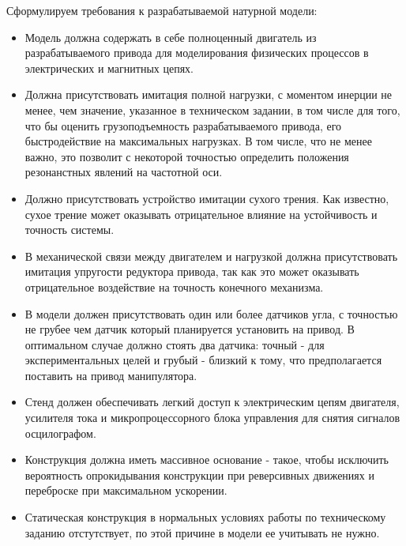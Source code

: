 Сформулируем требования к разрабатываемой натурной модели:
\begin{itemize}
    \item Модель должна содержать в себе полноценный двигатель из разрабатываемого
    привода для моделирования физических процессов в электрических и магнитных цепях.

    \item Должна присутствовать имитация полной нагрузки, с моментом инерции не менее, чем
    значение, указанное в техническом задании, в том числе для того, что бы оценить
    грузоподъемность разрабатываемого привода, его быстродействие на максимальных
    нагрузках. В том числе, что не менее важно, это позволит с некоторой точностью
    определить положения резонанстных явлений на частотной оси.

    \item Должно присутствовать устройство имитации сухого трения. Как
    известно, сухое трение может оказывать отрицательное влияние на устойчивость
    и точность системы.

    \item В механической связи между двигателем и нагрузкой должна присутствовать имитация
    упругости редуктора привода, так как это может оказывать отрицательное воздействие
    на точность конечного механизма.

    \item В модели должен присутствовать один или более датчиков угла, с точностью не
    грубее чем датчик который планируется установить на привод. В оптимальном случае должно
    стоять два датчика: точный - для экспериментальных целей и грубый - близкий
    к тому, что предполагается поставить на привод манипулятора.

    \item Стенд должен обеспечивать легкий доступ к электрическим цепям двигателя,
    усилителя тока и микропроцессорного блока управления для снятия сигналов
    осцилографом.

    \item Конструкция должна иметь массивное основание - такое, чтобы
    исключить вероятность опрокидывания конструкции при реверсивных движениях
    и переброске при максимальном ускорении.

    \item Статическая конструкция в нормальных условиях работы по техническому
    заданию отстутствует, по этой причине в модели ее учитывать не нужно.
\end{itemize}

\endinput
